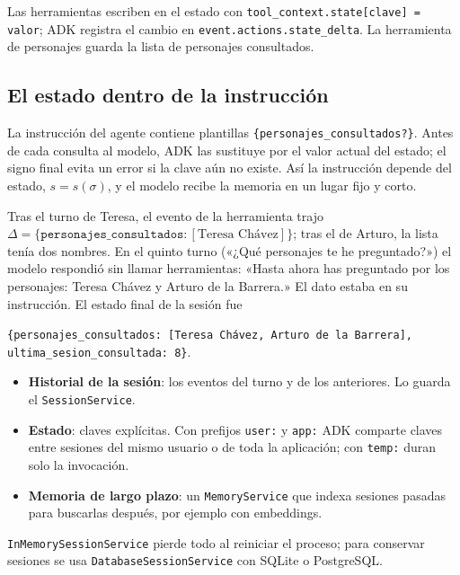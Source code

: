 \documentclass[11pt,letterpaper,oneside]{report}
\newcommand{\codigoagente}{../../../agentes/asistente_teresa/agent.py}
\begin{document}
Las herramientas escriben en el estado con \texttt{tool\_context.state[clave] = valor}; ADK registra el cambio en \texttt{event.actions.state\_delta}. La herramienta de personajes guarda la lista de personajes consultados.



\subsection{El estado dentro de la instrucción}

La instrucción del agente contiene plantillas \texttt{\{personajes\_consultados?\}}. Antes de cada consulta al modelo, ADK las sustituye por el valor actual del estado; el signo final evita un error si la clave aún no existe. Así la instrucción depende del estado, $s=s(\sigma)$, y el modelo recibe la memoria en un lugar fijo y corto.

\begin{ejemplo}
Tras el turno de Teresa, el evento de la herramienta trajo $\Delta=\{\texttt{personajes\_consultados}: [\text{Teresa Chávez}]\}$; tras el de Arturo, la lista tenía dos nombres. En el quinto turno («¿Qué personajes te he preguntado?») el modelo respondió sin llamar herramientas: «Hasta ahora has preguntado por los personajes: Teresa Chávez y Arturo de la Barrera.» El dato estaba en su instrucción. El estado final de la sesión fue
\begin{center}\small
\texttt{\{\textquotedbl{}personajes\_consultados\textquotedbl{}: [\textquotedbl{}Teresa Chávez\textquotedbl{}, \textquotedbl{}Arturo de la Barrera\textquotedbl{}],}\\ \texttt{\textquotedbl{}ultima\_sesion\_consultada\textquotedbl{}: 8\}}.
\end{center}
\end{ejemplo}

\begin{nota}
\begin{itemize}
  \item \textbf{Historial de la sesión}: los eventos del turno y de los anteriores. Lo guarda el \texttt{SessionService}.
  \item \textbf{Estado}: claves explícitas. Con prefijos \texttt{user:} y \texttt{app:} ADK comparte claves entre sesiones del mismo usuario o de toda la aplicación; con \texttt{temp:} duran solo la invocación.
  \item \textbf{Memoria de largo plazo}: un \texttt{MemoryService} que indexa sesiones pasadas para buscarlas después, por ejemplo con embeddings.
\end{itemize}
\texttt{InMemorySessionService} pierde todo al reiniciar el proceso; para conservar sesiones se usa \texttt{DatabaseSessionService} con SQLite o PostgreSQL.
\end{nota}
\end{document}
